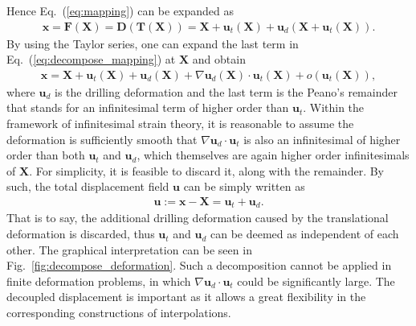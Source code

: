 \documentclass[3p,sort&compress,review,11pt]{elsarticle}
\newcommand*{\figref}[1]{Fig.~\ref{#1}}
\newcommand*{\eqsref}[1]{Eq.~(\ref{#1})}
\newcommand*{\mb}{\bm}
\begin{document}
Hence \eqsref{eq:mapping} can be expanded as
\begin{gather}\label{eq:decompose_mapping}
\mb{x}=\mb{F}\left(\mb{X}\right)=\mb{D}\left(\mb{T}\left(\mb{X}\right)\right)=\mb{X}+\mb{u}_t\left(\mb{X}\right)+\mb{u}_d\left(\mb{X}+\mb{u}_t\left(\mb{X}\right)\right).
\end{gather}
By using the Taylor series, one can expand the last term in \eqsref{eq:decompose_mapping} at $\mb{X}$ and obtain
\begin{gather*}
\mb{x}=\mb{X}+\mb{u}_t\left(\mb{X}\right)+\mb{u}_d\left(\mb{X}\right)+\nabla\mb{u}_d\left(\mb{X}\right)\cdot\mb{u}_t\left(\mb{X}\right)+o\left(\mb{u}_t\left(\mb{X}\right)\right),
\end{gather*}
where $\mb{u}_d$ is the drilling deformation and the last term is the Peano's remainder that stands for an infinitesimal term of higher order than $\mb{u}_t$. Within the framework of infinitesimal strain theory, it is reasonable to assume the deformation is sufficiently smooth that $\nabla\mb{u}_d\cdot\mb{u}_t$ is also an infinitesimal of higher order than both $\mb{u}_t$ and $\mb{u}_d$, which themselves are again higher order infinitesimals of $\mb{X}$. For simplicity, it is feasible to discard it, along with the remainder. By such, the total displacement field $\mb{u}$ can be simply written as
\begin{gather}\label{eq:decompose_deformation}
\mb{u}:=\mb{x}-\mb{X}=\mb{u}_t+\mb{u}_d.
\end{gather}
That is to say, the additional drilling deformation caused by the translational deformation is discarded, thus $\mb{u}_t$ and $\mb{u}_d$ can be deemed as independent of each other. The graphical interpretation can be seen in \figref{fig:decompose_deformation}. Such a decomposition cannot be applied in finite deformation problems, in which $\nabla\mb{u}_d\cdot\mb{u}_t$ could be significantly large. The decoupled displacement is important as it allows a great flexibility in the corresponding constructions of interpolations.
\end{document}
